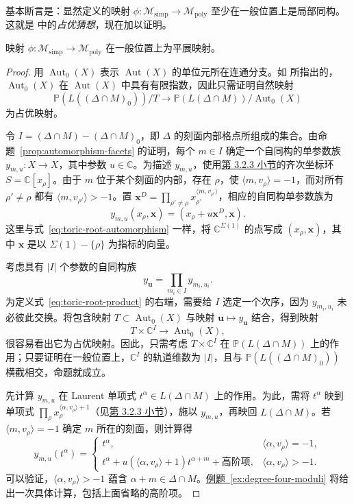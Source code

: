 基本断言是：显然定义的映射 $\phi:\mathcal M_{\mathrm{simp}}\to\mathcal M_{\mathrm{poly}}$ 至少在一般位置上是局部同构。这就是  中的\emph{占优猜想}，现在加以证明。
\begin{proposition}\label{prop:simplified-moduli-etale}
映射 $\phi:\mathcal M_{\mathrm{simp}}\to\mathcal M_{\mathrm{poly}}$ 在一般位置上为平展映射。
\end{proposition}
\begin{proof}
用 $\operatorname{Aut}_0(X)$ 表示 $\operatorname{Aut}(X)$ 的单位元所在连通分支。如  所指出的，$\operatorname{Aut}_0(X)$ 在 $\operatorname{Aut}(X)$ 中具有有限指数，因此只需证明自然映射
\[
\mathbb P(L((\Delta\cap M)_0))/T\longrightarrow
\mathbb P(L(\Delta\cap M))/\operatorname{Aut}_0(X)
\]
为占优映射。

令 $I=(\Delta\cap M)-(\Delta\cap M)_0$，即 $\Delta$ 的刻面内部格点所组成的集合。由命题~\ref{prop:automorphism-facets} 的证明，每个 $m\in I$ 确定一个自同构的单参数族 $y_{m,u}:X\to X$，其中参数 $u\in\mathbb C$。为描述 $y_{m,u}$，使用\hyperref[subsec:homogeneous-ring]{第 3.2.3 小节}的齐次坐标环 $S=\mathbb C[x_\rho]$。由于 $m$ 位于某个刻面的内部，存在 $\rho$，使 $\langle m,v_\rho\rangle=-1$，而对所有 $\rho'\ne\rho$ 都有 $\langle m,v_{\rho'}\rangle>-1$。置
$\mathbf x^D=\prod_{\rho'\ne\rho}x_{\rho'}^{\langle m,v_{\rho'}\rangle}$，相应的自同构单参数族为
\[
y_{m,u}(x_\rho,\mathbf x)=(x_\rho+u\mathbf x^D,\mathbf x).
\]
这里与式~\eqref{eq:toric-root-automorphism} 一样，将 $\mathbb C^{\Sigma(1)}$ 的点写成 $(x_\rho,\mathbf x)$，其中 $\mathbf x$ 是以 $\Sigma(1)-\{\rho\}$ 为指标的向量。

考虑具有 $|I|$ 个参数的自同构族
\begin{equation}\label{eq:toric-root-product}
y_{\mathbf u}=\prod_{m_i\in I}y_{m_i,u_i}.
\end{equation}
为定义式~\eqref{eq:toric-root-product} 的右端，需要给 $I$ 选定一个次序，因为 $y_{m_i,u_i}$ 未必彼此交换。将包含映射 $T\subset\operatorname{Aut}_0(X)$ 与映射 $\mathbf u\mapsto y_{\mathbf u}$ 结合，得到映射
\[
T\times\mathbb C^I\longrightarrow\operatorname{Aut}_0(X),
\]
很容易看出它为占优映射。因此，只需考虑 $T\times\mathbb C^I$ 在 $\mathbb P(L(\Delta\cap M))$ 上的作用；只要证明在一般位置上，$\mathbb C^I$ 的轨道维数为 $|I|$，且与 $\mathbb P(L((\Delta\cap M)_0))$ 横截相交，命题就成立。

先计算 $y_{m,u}$ 在 Laurent 单项式 $t^\alpha\in L(\Delta\cap M)$ 上的作用。为此，需将 $t^\alpha$ 映到单项式 $\prod_\rho x_\rho^{\langle\alpha,v_\rho\rangle+1}$（见\hyperref[subsec:homogeneous-ring]{第 3.2.3 小节}），施以 $y_{m,u}$，再映回 $L(\Delta\cap M)$。若 $\langle m,v_\rho\rangle=-1$ 确定 $m$ 所在的刻面，则计算得
\[
y_{m,u}(t^\alpha)=
\begin{cases}
t^\alpha,&\langle\alpha,v_\rho\rangle=-1,\\
t^\alpha+u(\langle\alpha,v_\rho\rangle+1)t^{\alpha+m}
+\text{高阶项},&\langle\alpha,v_\rho\rangle>-1.
\end{cases}
\]
可以验证，$\langle\alpha,v_\rho\rangle>-1$ 蕴含 $\alpha+m\in\Delta\cap M$。\hyperref[ex:degree-four-moduli]{例题~\ref*{ex:degree-four-moduli}} 将给出一次具体计算，包括上面省略的高阶项。


\end{proof}
